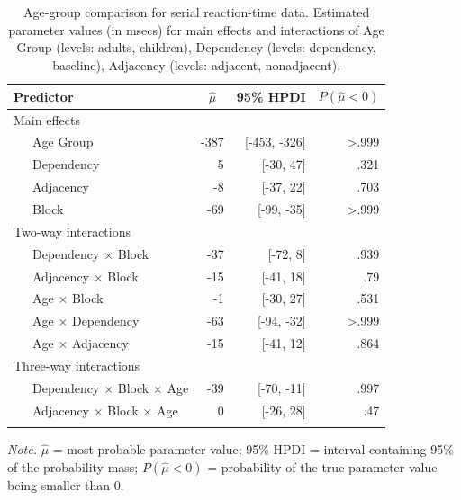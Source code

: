 \documentclass[
  english,
  man,floatsintext]{apa7}
\begin{document}
\begin{table}[ht]

\begin{center}
\begin{threeparttable}

\caption{\label{tab:tablemodel}Age-group comparison for serial reaction-time data. Estimated parameter values (in msecs) for main effects and interactions of Age Group (levels: adults, children), Dependency (levels: dependency, baseline), Adjacency (levels: adjacent, nonadjacent).}

\footnotesize{

\begin{tabular}{lrrr}
\toprule
Predictor & \multicolumn{1}{c}{$\hat{\mu}$} & \multicolumn{1}{c}{95\% HPDI} & \multicolumn{1}{c}{$P(\hat{\mu}<0)$}\\
\midrule
Main effects &  &  & \\
\ \ \ Age Group & -387 & [-453, -326] & >.999\\
\ \ \ Dependency & 5 & [-30, 47] & .321\\
\ \ \ Adjacency & -8 & [-37, 22] & .703\\
\ \ \ Block & -69 & [-99, -35] & >.999\\
Two-way interactions &  &  & \\
\ \ \ Dependency $\times$ Block & -37 & [-72, 8] & .939\\
\ \ \ Adjacency $\times$ Block & -15 & [-41, 18] & .79\\
\ \ \ Age $\times$ Block & -1 & [-30, 27] & .531\\
\ \ \ Age $\times$ Dependency & -63 & [-94, -32] & >.999\\
\ \ \ Age $\times$ Adjacency & -15 & [-41, 12] & .864\\
Three-way interactions &  &  & \\
\ \ \ Dependency $\times$ Block $\times$ Age & -39 & [-70, -11] & .997\\
\ \ \ Adjacency $\times$ Block $\times$ Age & 0 & [-26, 28] & .47\\
\bottomrule
\addlinespace
\end{tabular}

}

\begin{tablenotes}[para]
\normalsize{\textit{Note.} $\hat{\mu}$ = most probable parameter value; 95\% HPDI = interval containing 95\% of the probability mass; $P(\hat{\mu}<0)$ = probability of the true parameter value being smaller than 0.}
\end{tablenotes}

\end{threeparttable}
\end{center}

\end{table}
\end{document}
